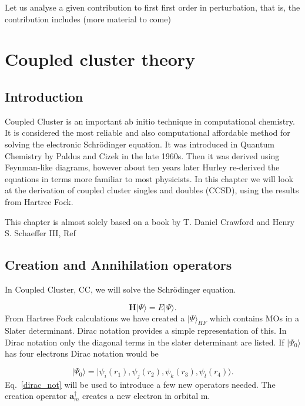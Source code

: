 \documentclass[graybox,sectrefs,envcountresetchap,open=right]{svmonodo}
\begin{document}
Let us analyse a given contribution to first first order in perturbation, that is, the contribution includes (more material to come)




\chapter{Coupled cluster theory}
\label{ch:cc}

\section{Introduction}
Coupled Cluster is an important ab initio technique in computational chemistry. It is considered the most reliable and also computational affordable method for solving the electronic Schr\"{o}dinger equation. It was introduced in Quantum Chemistry by Paldus and Cizek in the late 1960s. Then it was derived using Feynman-like diagrams, however about ten years later Hurley re-derived the equations in terms more familiar to most physicists. In this chapter we will look at the derivation of coupled cluster singles and doubles (CCSD), using the results from Hartree Fock.

This chapter is almost solely based on a book by T. Daniel Crawford and Henry S. Schaeffer III, 
Ref

\section{Creation and Annihilation operators}
In Coupled Cluster, CC, we will solve the Schr\"{o}dinger equation.

\begin{equation}
\mathbf{H} | \Psi \rangle = E | \Psi \rangle \label{SE} .
\end{equation}
From Hartree Fock calculations we have created a $|\Psi\rangle_{HF}$ which contains MOs in a Slater determinant. Dirac notation provides a simple representation of this. In Dirac notation only the diagonal terms in the slater determinant are listed. If $|\Psi_0 \rangle$ has four electrons Dirac notation would be

\begin{equation}
|\Psi_0 \rangle =  |\psi_i(r_1), \psi_j(r_2), \psi_k(r_3), \psi_l(r_4) \rangle . \label{dirac_not} 
\end{equation}
Eq.~\ref{dirac_not} will be used to introduce a few new operators needed. The creation operator $\mathbf{a}^{\dagger}_m$ creates a new electron in orbital m.
\end{document}
